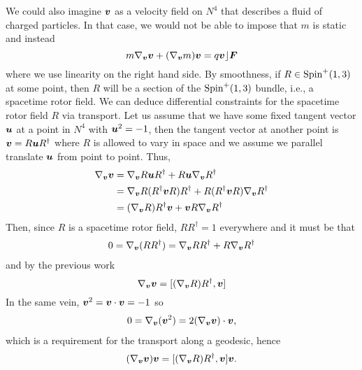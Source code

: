 \documentclass[conf]{new-aiaa}
\begin{document}
We could also imagine ${\boldsymbol{v}}$ as a velocity field on $N^4$ that describes a fluid of charged particles. In that case, we would not be able to impose that $m$ is static and instead
\begin{equation}
    m \nabla_{\boldsymbol{v}} \boldsymbol{v} + (\nabla_{\boldsymbol{v}} m)\boldsymbol{v} = q\boldsymbol{v} \rfloor \boldsymbol{F}
\end{equation}
where we use linearity on the right hand side.
By smoothness, if $R\in \operatorname{Spin}^+(1,3)$ at some point, then $R$ will be a section of the $\operatorname{Spin}^+(1,3)$ bundle, i.e., a spacetime rotor field. We can deduce differential constraints for the spacetime rotor field $R$ via transport. Let us assume that we have some fixed tangent vector $\boldsymbol{u}$ at a point in $N^4$ with $\boldsymbol{u}^2 = -1$, then the tangent vector at another point is $\boldsymbol{v}=R\boldsymbol{u}R^\dagger$ where $R$ is allowed to vary in space and we assume we parallel translate $\boldsymbol{u}$ from point to point. Thus,
\begin{align}
    \nabla_{\boldsymbol{v}} {\boldsymbol{v}} &= \nabla_{\boldsymbol{v}} R {\boldsymbol{u}} R^\dagger + R{\boldsymbol{u}} \nabla_{\boldsymbol{v}} R^\dagger \\
    &= \nabla_{\boldsymbol{v}} R(R^\dagger {\boldsymbol{v}} R)R^\dagger + R(R^\dagger {\boldsymbol{v}}R)\nabla_{\boldsymbol{v}} R^\dagger\\
    &= (\nabla_{\boldsymbol{v}} R) R^\dagger {\boldsymbol{v}} + {\boldsymbol{v}} R \nabla_{\boldsymbol{v}} R^\dagger
\end{align}
Then, since $R$ is a spacetime rotor field, $RR^\dagger = 1$ everywhere and it must be that
\begin{align}
    0 = \nabla_{\boldsymbol{v}} (RR^\dagger) = \nabla_{\boldsymbol{v}} R R^\dagger + R\nabla_{\boldsymbol{v}}R^\dagger
\end{align}
and by the previous work 
\begin{equation}
    \nabla_{\boldsymbol{v}} {\boldsymbol{v}} = [(\nabla_{\boldsymbol{v}} R) R^\dagger,{\boldsymbol{v}}]
\end{equation}
In the same vein, ${\boldsymbol{v}}^2={\boldsymbol{v}}\cdot {\boldsymbol{v}}=-1$ so
\begin{align}
    0=\nabla_{\boldsymbol{v}} ({\boldsymbol{v}}^2)=2(\nabla_{\boldsymbol{v}} {\boldsymbol{v}})\cdot {\boldsymbol{v}},
\end{align}
which is a requirement for the transport along a geodesic, hence
\begin{align}
    (\nabla_{\boldsymbol{v}} {\boldsymbol{v}}) {\boldsymbol{v}} = [(\nabla_{\boldsymbol{v}} R)R^\dagger,{\boldsymbol{v}}] {\boldsymbol{v}}.
\end{align}
\end{document}
